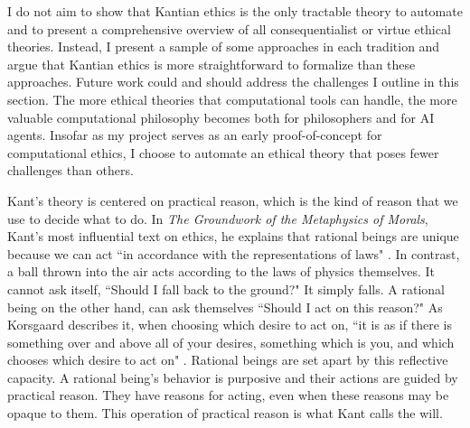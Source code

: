 \begin{isabellebody}
\begin{isamarkuptext}
I do not aim to show that Kantian ethics is the only tractable theory to automate and
to present a comprehensive overview of all consequentialist or virtue ethical theories. Instead, I 
present a sample of some approaches in each tradition and argue that Kantian ethics is more straightforward 
to formalize than these approaches. Future work could and should address the challenges I outline in 
this section. The more ethical theories that computational tools can handle, the more valuable 
computational philosophy becomes both for philosophers and for AI agents. Insofar as my project serves 
as an early proof-of-concept for computational ethics, I choose to automate an ethical theory that 
poses fewer challenges than others.%
\end{isamarkuptext}\isamarkuptrue%
%
\isadelimdocument
%
\endisadelimdocument
%
\isatagdocument
%
\isamarkuptrue%
%
\isamarkuptrue%
%
\endisatagdocument
{\isafolddocument}%
%
\isadelimdocument
%
\endisadelimdocument
%
\begin{isamarkuptext}%
Kant's theory is centered on practical reason, which is the kind of reason that we 
use to decide what to do. In \emph{The Groundwork of the Metaphysics of Morals}, Kant's most influential 
text on ethics, he explains that rational beings are unique because we can act ``in accordance with 
the representations of laws" \cite[4:412]{groundwork}. In contrast, a ball thrown into the air acts 
according to the laws of physics themselves. It cannot ask itself, ``Should I fall back to the ground?" 
It simply falls. A rational being on the other hand, can ask themselves ``Should I act on this reason?" 
As Korsgaard describes it, when choosing which desire to act on, ``it is as if there is something over 
and above all of your desires, something which is you, and which chooses which desire to act on" \cite[100]{sources}. 
Rational beings are set apart by this reflective capacity. A rational being's behavior is purposive and 
their actions are guided by practical reason. They have reasons for acting, even when these reasons may be 
opaque to them. This operation of practical reason is what Kant calls the will. 


\end{isamarkuptext}
\end{isabellebody}
